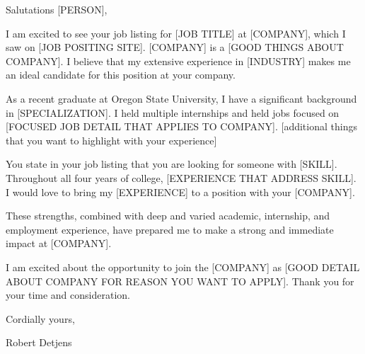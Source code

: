 \documentclass[11pt]{article} %
\begin{document}
\userinformation %

\framebreak %






\setlength{\parskip}{1em}

Salutations [PERSON],

I am excited to see your job listing for [JOB TITLE] at [COMPANY], which I saw on [JOB POSITING SITE]. [COMPANY] is a
[GOOD THINGS ABOUT COMPANY]. I believe that my extensive experience in [INDUSTRY] makes me an ideal candidate for this
position at your company.

As a recent graduate at Oregon State University, I have a significant background in [SPECIALIZATION]. I held multiple
internships and held jobs focused on [FOCUSED JOB DETAIL THAT APPLIES TO COMPANY]. [additional things that you want to
highlight with your experience]

You state in your job listing that you are looking for someone with [SKILL]. Throughout all four years of college,
[EXPERIENCE THAT ADDRESS SKILL]. I would love to bring my [EXPERIENCE] to a position with your [COMPANY].

These strengths, combined with deep and varied academic, internship, and employment experience, have prepared me to make
a strong and immediate impact at [COMPANY].

I am excited about the opportunity to join the [COMPANY] as [GOOD DETAIL ABOUT COMPANY FOR REASON YOU WANT TO APPLY].
Thank you for your time and consideration.

Cordially yours,

Robert Detjens

\end{document}
